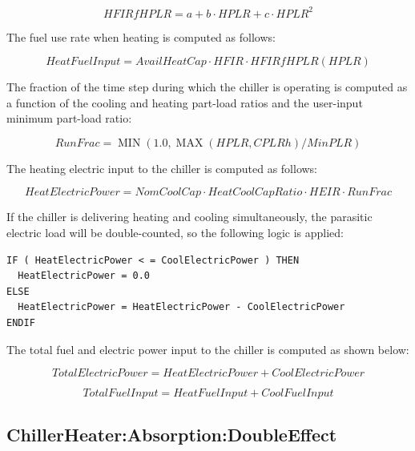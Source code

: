 \begin{equation}
HFIRfHPLR = a + b \cdot HPLR + c \cdot HPL{R^2}
\end{equation}

The fuel use rate when heating is computed as follows:

\begin{equation}
HeatFuelInput = AvailHeatCap \cdot HFIR \cdot HFIRfHPLR(HPLR)
\end{equation}

The fraction of the time step during which the chiller is operating is computed as a function of the cooling and heating part-load ratios and the user-input minimum part-load ratio:

\begin{equation}
RunFrac = \operatorname{MIN} \left( {1.0,\operatorname{MAX} \left( {HPLR,CPLRh} \right)/MinPLR} \right)
\end{equation}

The heating electric input to the chiller is computed as follows:

\begin{equation}
HeatElectricPower = NomCoolCap \cdot HeatCoolCapRatio \cdot HEIR \cdot RunFrac
\end{equation}

If the chiller is delivering heating and cooling simultaneously, the parasitic electric load will be double-counted, so the following logic is applied:

\begin{lstlisting}
IF ( HeatElectricPower < = CoolElectricPower ) THEN
  HeatElectricPower = 0.0
ELSE
  HeatElectricPower = HeatElectricPower - CoolElectricPower
ENDIF
\end{lstlisting}

The total fuel and electric power input to the chiller is computed as shown below:

\begin{equation}
TotalElectricPower = HeatElectricPower + CoolElectricPower
\end{equation}

\begin{equation}
TotalFuelInput = HeatFuelInput + CoolFuelInput
\end{equation}

\subsection{ChillerHeater:Absorption:DoubleEffect}\label{chillerheaterabsorptiondoubleeffect}

